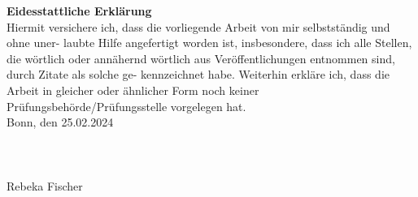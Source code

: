 \large{\textbf{Eidesstattliche Erklärung}}
\\
Hiermit versichere ich, dass die vorliegende Arbeit von mir selbstständig und ohne uner-
laubte Hilfe angefertigt worden ist, insbesondere, dass ich alle Stellen, die wörtlich oder
annähernd wörtlich aus Veröffentlichungen entnommen sind, durch Zitate als solche ge-
kennzeichnet habe. Weiterhin erkläre ich, dass die Arbeit in gleicher
oder ähnlicher Form noch keiner Prüfungsbehörde/Prüfungsstelle vorgelegen hat.
\\
Bonn, den 25.02.2024
\\
\\
\\
\\
Rebeka Fischer 


